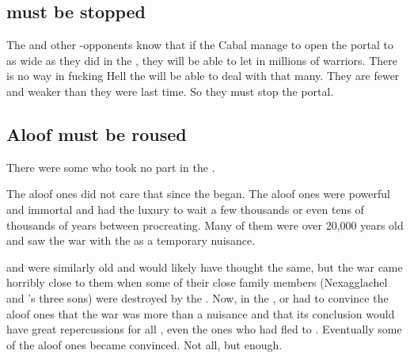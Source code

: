






\subsection{\Voidbringer must be stopped}
The \dragons{} and other \bane-opponents know that if the Cabal manage to open the portal to \Erebos{} as wide as they did in the \secondbanewar, they will be able to let in millions of \bane{} warriors. 
There is no way in fucking Hell the \Miithians will be able to deal with that many.
They are fewer and weaker than they were last time. 
So they must stop the portal. 








\subsection{Aloof \dragons must be roused}
There were some  who took no part in the \feud.

The aloof ones did not care that  since the  began.
The aloof ones were powerful and immortal and had the luxury to wait a few thousands or even tens of thousands of years between procreating. Many of them were over 20,000 years old and saw the war with the \resphain as a temporary nuisance. 

\Ishnaruchaefir and \Secherdamon were similarly old and would likely have thought the same, but the war came horribly close to them when some of their close family members (Nexagglachel and \Ishnaruchaefir's three sons) were destroyed by the \resphain.
Now, in the \thirdbanewar, \Secherdamon or \Ishnaruchaefir had to convince the aloof ones that the war was more than a nuisance and that its conclusion would have great repercussions for all \dragons, even the ones who had fled to \Machai.
Eventually some of the aloof ones became convinced. 
Not all, but enough.

